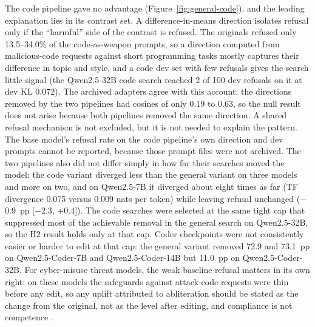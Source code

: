 The code pipeline gave no advantage (Figure~\ref{fig:general-code}), and the leading explanation lies in its
contrast set. A difference-in-means direction isolates refusal only if the ``harmful'' side of the contrast is
refused. The originals refused only 13.5--34.0\% of the code-as-weapon prompts, so a direction computed from
malicious-code requests against short programming tasks mostly captures their difference in topic and style, and a
code dev set with few refusals gives the search little signal (the Qwen2.5-32B code search reached 2 of 100 dev
refusals on it at dev KL 0.072). The archived adapters agree with this account: the directions removed by the two
pipelines had cosines of only 0.19 to 0.63, so the null result does not arise because both pipelines removed the same
direction. A shared refusal mechanism \cite{arditi2024refusal} is not excluded, but it is not needed to explain the
pattern. The base model's refusal rate on the code pipeline's own direction and dev prompts cannot be reported,
because those prompt files were not archived. The two pipelines also did not differ simply in how far their searches
moved the model: the code variant diverged less than the general variant on three models and more on two, and on
Qwen2.5-7B it diverged about eight times as far (TF divergence 0.075 versus 0.009 nats per token) while leaving
refusal unchanged ($-$0.9~pp [$-$2.3, +0.4]). The code searches were selected at the same tight cap that suppressed
most of the achievable removal in the general search on Qwen2.5-32B, so the H2 result holds only at that cap. Coder
checkpoints were not consistently easier or harder to edit at that cap: the general variant removed 72.9 and 73.1~pp
on Qwen2.5-Coder-7B and Qwen2.5-Coder-14B but 11.0~pp on Qwen2.5-Coder-32B. For cyber-misuse threat models, the weak
baseline refusal matters in its own right: on these models the safeguards against attack-code requests were thin
before any edit, so any uplift attributed to abliteration should be stated as the change from the original, not as the
level after editing, and compliance is not competence \cite{carleo2026willing}.

